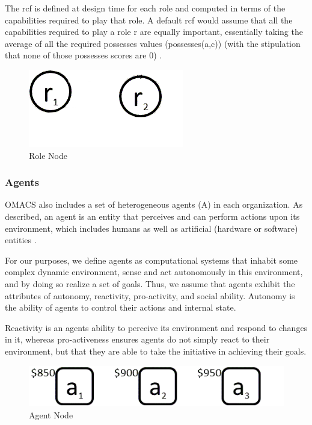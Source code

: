 The rcf is defined at design time for each role and computed in terms of 
the capabilities required to play that role.
A default rcf would assume that all the capabilities required to play a role r are equally important,
essentially taking the average of all the required possesses values (possesses(a,c))
(with the stipulation that none of those possesses scores are 0) \cite{omacs4}.
\hspace{1.5cm}
\begin{figure}[th]
	\centering
		\includegraphics[scale=0.5]{ch1/img/roles}
	\caption{\label{fig:Role Node}Role Node}
\end{figure}
\hspace{1cm}
\subsubsection{Agents}

OMACS also includes a set of heterogeneous agents (A) in each organization. 
As described, an agent is an entity that perceives and can perform actions upon its
environment, which includes humans as well as artificial (hardware or software) entities \cite{omacs2}.

For our purposes, we define agents as computational systems that inhabit some complex dynamic
environment, sense and act autonomously in this environment, and by doing so realize a set of
goals. Thus, we assume that agents exhibit the attributes of autonomy, reactivity, pro-activity, and
social ability. Autonomy is the ability of agents to control their actions and internal state.


Reactivity is an agents ability to perceive its environment and respond to changes in it, whereas
pro-activeness ensures agents do not simply react to their environment, but that they are able to
take the initiative in achieving their goals. 

\hspace{1cm}
\begin{figure}[th]
	\centering
		\includegraphics[scale=0.5]{ch1/img/agents}
	\caption{\label{fig:Agent Node}Agent Node}
\end{figure}
\hspace{1cm}



